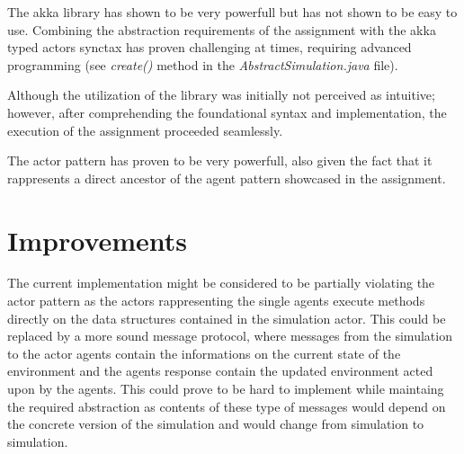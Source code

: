 \documentclass[12pt, a4paper]{report}
\begin{document}
The akka library has shown to be very powerfull but has not shown to be easy to use. Combining the abstraction requirements of the assignment with the
 akka typed actors synctax has proven challenging at times, requiring advanced programming (see \emph{create()} method in the \emph{AbstractSimulation.java} file).

Although the utilization of the library was initially not perceived as intuitive; however, after comprehending the foundational syntax and implementation,
 the execution of the assignment proceeded seamlessly.

The actor pattern has proven to be very powerfull, also given the fact that it rappresents a direct ancestor of the agent pattern showcased in the assignment.

\section{Improvements}
The current implementation might be considered to be partially violating the actor pattern as the actors rappresenting the single agents execute methods
 directly on the data structures contained in the simulation actor. This could be replaced by a more sound message protocol, where messages from the
 simulation to the actor agents contain the informations on the current state of the environment and the agents response contain the updated environment
 acted upon by the agents. This could prove to be hard to implement while maintaing the required abstraction as contents of these type of messages would
 depend on the concrete version of the simulation and would change from simulation to simulation.



\end{document}

